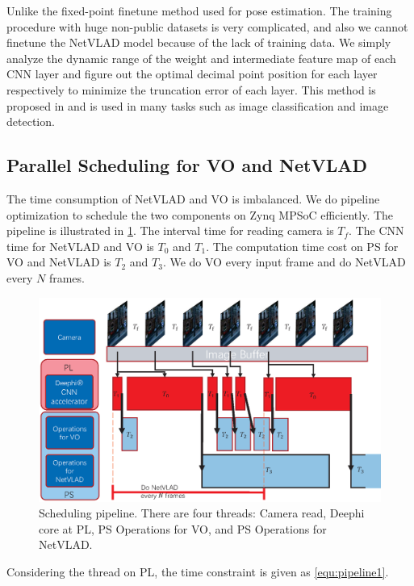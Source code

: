 Unlike the fixed-point finetune method used for pose estimation. The training procedure with huge non-public datasets is very complicated, and also we cannot finetune the NetVLAD model because of the lack of training data. We simply analyze the dynamic range of the weight and intermediate feature map of each CNN layer and figure out the optimal decimal point position for each layer respectively to minimize the truncation error of each layer.
This method is proposed in \cite{Qiu:2016151} and is used in many tasks such as image classification and image detection.

\subsection{Parallel Scheduling for VO and NetVLAD}

The time consumption of NetVLAD and VO is imbalanced. We do pipeline optimization to schedule the two components on Zynq MPSoC efficiently. The pipeline is illustrated in \cref{fig:pipline}. The interval time for reading camera is $T_{f}$. The CNN time for NetVLAD and VO is $T_{0}$ and $T_{1}$. The computation time cost on PS for VO and NetVLAD is $T_{2}$ and $T_{3}$. We do VO every input frame and do NetVLAD every $N$ frames.

\begin{figure}[t]
    \centering  
    \includegraphics[width=0.95\linewidth]{fig/pipeline.eps}
    \caption{Scheduling pipeline. There are four threads: Camera read, Deephi core at PL, PS Operations for VO, and PS Operations for NetVLAD.}
    \label{fig:pipline}
\end{figure}


Considering the thread on PL, the time constraint is given as \cref{equ:pipeline1}. 

